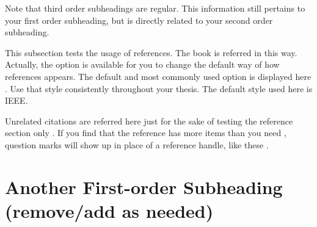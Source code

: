 \indent \indent Note that third order subheadings are regular. This information still pertains to your first order subheading, but is directly related to your second order subheading.

\indent\indent This subsection tests the usage of references. The book \cite{REALCAR} is referred in this way. Actually, the option is available for you to change the default way of how references appears. The default and most commonly used option \cite{einstein} is displayed here \cite{Barn-JORVQ}. Use that style consistently throughout your thesis. The default style used here is IEEE.

\indent\indent Unrelated citations are referred here just for the sake of testing the reference section only \cite{TAMU}. If you find that the reference \cite{GIGEM} has more items than you need \cite{WAGFJ}, question marks will show up in place of a reference handle, like these \cite{Over9000}.


\section{Another First-order Subheading (remove/add as needed)} %

\vspace{-0.4em} %

\indent{}










